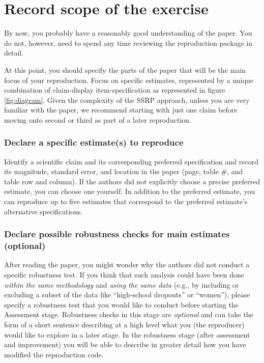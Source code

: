 \documentclass[
]{book}
\begin{document}
\hypertarget{declare-estimates}{%
\section{Record scope of the exercise}\label{declare-estimates}}

By now, you probably have a reasonably good understanding of the paper. You do not, however, need to spend any time reviewing the reproduction package in detail.

At this point, you should specify the parts of the paper that will be the main focus of your reproduction. Focus on specific estimates, represented by a unique combination of claim-display item-specification as represented in figure \ref{fig:diagram}. Given the complexity of the SSRP approach, unless you are very familiar with the paper, we recommend starting with just one claim before moving onto second or third as part of a later reproduction.

\hypertarget{declare-a-specific-estimates-to-reproduce}{%
\subsubsection*{Declare a specific estimate(s) to reproduce}\label{declare-a-specific-estimates-to-reproduce}}

Identify a scientific claim and its corresponding preferred specification and record its magnitude, standard error, and location in the paper (page, table \#, and table row and column). If the authors did not explicitly choose a precise preferred estimate, you can choose one yourself. In addition to the preferred estimate, you can reproduce up to five estimates that correspond to the preferred estimate's alternative specifications.

\hypertarget{declare-possible-robustness-checks-for-main-estimates-optional}{%
\subsubsection*{Declare possible robustness checks for main estimates (optional)}\label{declare-possible-robustness-checks-for-main-estimates-optional}}

After reading the paper, you might wonder why the authors did not conduct a specific robustness test. If you think that such analysis could have been done \emph{within the same methodology} and \emph{using the same data} (e.g., by including or excluding a subset of the data like ``high-school dropouts'' or ``women''), please specify a robustness test that you would like to conduct before starting the Assessment stage. Robustness checks in this stage are \emph{optional} and can take the form of a short sentence describing at a high level what you (the reproducer) would like to explore in a later stage. In the robustness stage (after assessment and improvement) you will be able to describe in greater detail how you have modified the reproduction code.
\end{document}
